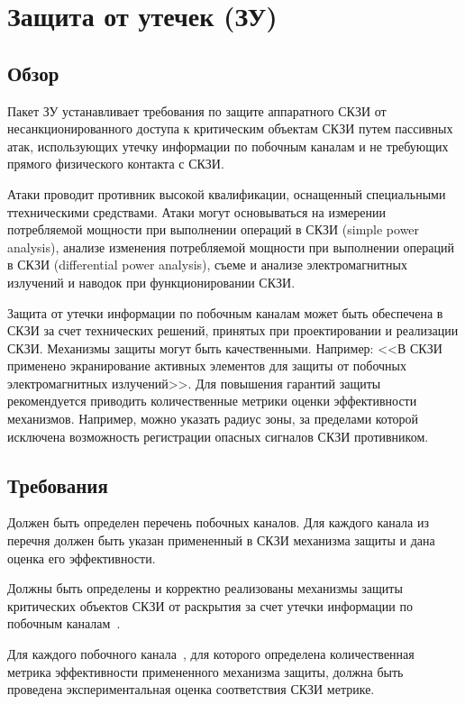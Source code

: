 \section{Защита от утечек (ЗУ)}\label{NI}

\subsection{Обзор}\label{NI.Intro}

Пакет ЗУ устанавливает требования по защите аппаратного СКЗИ от несанкционированного 
доступа к критическим объектам СКЗИ путем пассивных атак, использующих утечку 
информации по побочным каналам и не требующих прямого физического контакта с 
СКЗИ. 

Атаки проводит противник высокой квалификации, оснащенный специальными
ттехническими средствами. Атаки могут основываться на измерении потребляемой 
мощности при выполнении операций в СКЗИ (simple power analysis), анализе 
изменения потребляемой мощности при выполнении операций в СКЗИ (differential 
power analysis), съеме и анализе электромагнитных излучений и наводок при 
функционировании СКЗИ.

Защита от утечки информации по побочным каналам может быть обеспечена в СКЗИ за 
счет технических решений, принятых при проектировании и реализации СКЗИ. 
%
Механизмы защиты могут быть качественными. Например: 
<<В СКЗИ применено экранирование активных элементов для защиты от побочных 
электромагнитных излучений>>. 
%
Для повышения гарантий защиты рекомендуется приводить количественные метрики 
оценки эффективности механизмов. Например, можно указать радиус зоны, 
за пределами которой исключена возможность регистрации опасных сигналов 
СКЗИ противником.

\subsection{Требования}\label{NI.Reqs}


\label{R.NI.Channels}
Должен быть определен перечень побочных каналов. Для каждого канала из перечня
должен быть указан примененный в СКЗИ механизма защиты и дана оценка его
эффективности.
                             	

\label{R.NI.Protect}
Должны быть определены и корректно реализованы механизмы защиты критических 
объектов СКЗИ от раскрытия за счет утечки информации по побочным 
каналам~. 


\label{R.NI.Estimate}
Для каждого побочного канала~, для которого определена 
количественная метрика эффективности примененного механизма защиты, 
должна быть проведена экспериментальная оценка соответствия СКЗИ 
метрике.


